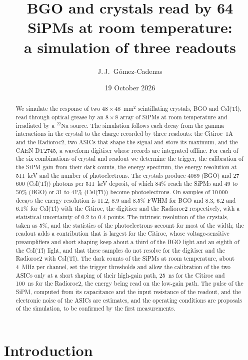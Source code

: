 \documentclass[11pt]{article}
\title{BGO and \csitl crystals read by 64 SiPMs at room temperature:\\
a simulation of three readouts}
\author{J.\,J.~Gómez-Cadenas}
\date{19 October 2026}
\newcommand{\Na}{\ensuremath{{}^{22}\mathrm{Na}}\xspace}
\newcommand{\csitl}{CsI(Tl)\xspace}
\begin{document}
\maketitle

\begin{abstract}
We simulate the response of two $48 \times 48$~mm$^2$ scintillating
crystals, BGO and \csitl, read through optical grease by an $8 \times 8$
array of SiPMs at room temperature and irradiated by a \Na source. The
simulation follows each decay from the gamma interactions in the crystal to
the charge recorded by three readouts: the Citiroc~1A and the Radioroc2,
two ASICs that shape the signal and store its maximum, and the CAEN DT2745,
a waveform digitiser whose records are integrated offline. For each of the
six combinations of crystal and readout we determine the trigger, the
calibration of the SiPM gain from their dark counts, the energy spectrum,
the energy resolution at 511~keV and the number of photoelectrons. The
crystals produce 4089 (BGO) and 27\,600 (\csitl) photons per 511~keV
deposit, of which 84\% reach the SiPMs and 49 to 50\% (BGO) or 31 to 41\%
(\csitl) become photoelectrons. On samples of 10\,000 decays the energy
resolution is 11.2, 8.9 and 8.5\% FWHM for BGO and 8.3, 6.2 and 6.1\% for
\csitl with the Citiroc, the digitiser and the Radioroc2 respectively,
with a statistical uncertainty of 0.2 to 0.4 points. The intrinsic resolution of the
crystals, taken as 5\%, and the statistics of the photoelectrons account
for most of the width; the readout adds a contribution that is largest for
the Citiroc, whose voltage-sensitive preamplifiers and short shaping keep
about a third of the BGO light and an eighth of the \csitl light, and that
these samples do not resolve for the digitiser and the Radioroc2 with
\csitl. The dark
counts of the SiPMs at room temperature, about 4~MHz per channel, set the
trigger thresholds and allow the calibration of the two ASICs only at a
short shaping of their high-gain path, 25~ns for the Citiroc and 100~ns for
the Radioroc2, the energy being read on the low-gain path. The pulse of the
SiPM, computed from its capacitance and the input resistance of the
readout, and the electronic noise of the ASICs are estimates, and the
operating conditions are proposals of the simulation, to be confirmed by
the first measurements.
\end{abstract}

\tableofcontents

\section{Introduction}
\end{document}
